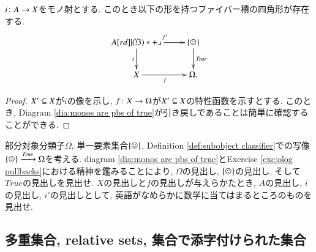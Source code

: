 \begin{corollary}\label{cor:monos are pullbacks of true}

$i\taking A\to X$をモノ射とする. このとき以下の形を持つファイバー積の四角形が存在する.
\begin{align}\label{dia:monos are pbs of true}
\xymatrix{A\ar[r]^{f'}\ar[d]_i\ullimit&\singleton\ar[d]^{\mathit{True}}\\X\ar[r]_f&\Omega.}
\end{align}

\end{corollary}

\begin{proof}


$X'\ss X$が$i$の像を示し, $f\taking X\to\Omega$が$X'\ss X$の特性函数を示すとする. このとき, Diagram \ref{dia:monos are pbs of true}が引き戻しであることは簡単に確認することができる.

\end{proof}

\begin{exercise}
%
部分対象分類子$\Omega$, 単一要素集合$\singleton$, Definition \ref{def:subobject classifier}での写像$\singleton\To{\mathit{True}}\Omega$を考える. diagram \ref{dia:monos are pbs of true}とExercise \ref{exc:olog pullbacks}における精神を鑑みることにより, $\Omega$の見出し, $\singleton$の見出し, そして$\mathit{True}$の見出しを見出せ. $X$の見出しと$f$の見出しが与えらかたとき, $A$の見出し, $i$の見出し, $i'$の見出しとして, 英語がなめらかに数学に当てはまるところのものを見出せ.
\end{exercise}


\subsection{多重集合, relative sets, 集合で添字付けられた集合}

